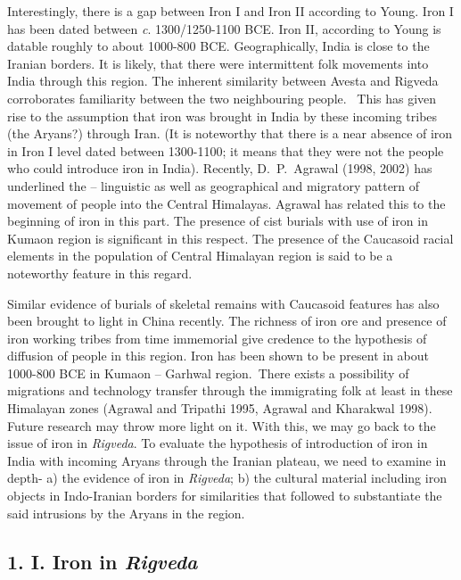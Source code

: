 Interestingly, there is a gap between Iron I and Iron II according to Young. Iron I has been dated between \textit{c}. 1300/1250-1100 BCE. Iron II, according to Young is datable roughly to about 1000-800 BCE. Geographically, India is close to the Iranian borders. It is likely, that there were intermittent folk movements into India through this region. The inherent similarity between Avesta and Rigveda corroborates familiarity  between the two neighbouring people.~ This has given rise to the assumption that iron was brought in India by these incoming tribes (the Aryans?) through Iran. (It is noteworthy that there is a near absence of iron in Iron I level dated between 1300-1100; it means that they were not the people who could introduce iron in India). Recently, D.~P.~Agrawal (1998, 2002) has underlined the – linguistic as well as geographical and migratory pattern of movement of people into the Central Himalayas. Agrawal has related this to the beginning of iron in this part. The presence of cist burials with use of iron in Kumaon region is significant in this respect. The presence of the Caucasoid racial elements in the population of Central Himalayan region is said to be a noteworthy feature in this regard. 

Similar evidence of burials of skeletal remains with Caucasoid features has also been brought to light in China recently. The richness of iron ore and presence of iron working tribes from time immemorial give credence to the hypothesis of diffusion of people in this region. Iron has been shown to be present in about 1000-800 BCE in Kumaon – Garhwal region.~There exists a possibility of migrations and technology transfer through the immigrating folk at least in these Himalayan zones (Agrawal and Tripathi 1995, Agrawal and Kharakwal 1998). Future research may throw more light on it. With this, we may go back to the issue of iron in \textit{Rigveda}. To evaluate the hypothesis of introduction of iron in India with incoming Aryans through the Iranian plateau, we need to examine in depth- a) the evidence of iron in \textit{Rigveda}; b) the cultural material including iron objects in Indo-Iranian borders for similarities that followed to substantiate the said intrusions by the Aryans in the region.

\vspace{-.4cm}

\subsection*{1. I. Iron in \textit{Rigveda}}\label{chapter3-subsection-1}

